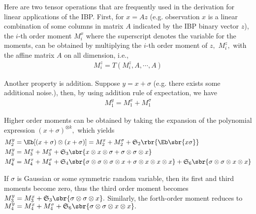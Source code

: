 \documentclass[twoside,11pt]{article}
\newcommand{\symm}{\mathfrak{S}}
\begin{document}
Here are two tensor operations that are frequently used in the derivation for linear applications of the IBP. First, for $x = Az$ (e.g. observation $x$ is a linear combination of some columns in matrix $A$ indicated by the IBP binary vector $z$), the $i$-th order moment
$M_i^x$ where the superscript denotes the variable for the moments,
can be obtained by multiplying the $i$-th order moment of $z,$ $M_i^z,$ with the affine matrix $A$ on all dimension, i.e.,
\begin{align}
M_i^z = T(M_i^z, A, \cdots, A)
\end{align}


Another property is addition. Suppose $y = x + \sigma$ (e.g. there exists some additional noise.), then, by using addition rule of expectation, we have 
\begin{align}
M_1^y = M_1^x + M_1^\sigma
\end{align}

Higher order moments can be obtained by taking the expansion of the polynomial expression $(x + \sigma)^{\otimes k},$ which yields
\begin{align}
&M_2^y = \Eb[(x+\sigma) \otimes (x+\sigma)] = M_2^x + M_2^\sigma + \symm_2\rbr{\Eb \sbr{x\sigma}} \\
&M_3^y = M_3^x + M_3^\sigma +  \symm_3 \sbr{x \otimes x \otimes \sigma + \sigma \otimes \sigma \otimes x} \\
&M_4^y = M_4^x + M_4^\sigma + \symm_4 \sbr{ \sigma \otimes \sigma \otimes \sigma \otimes x + \sigma \otimes x \otimes x \otimes x } + \symm_6 \sbr{\sigma \otimes \sigma \otimes x \otimes x}
\end{align}

 If $\sigma$ is Gaussian or some symmetric random variable, then its first and third moments become zero, thus the third order moment becomes $M_3^y = M_3^x + \symm_3 \sbr{ \sigma \otimes \sigma \otimes x}.$ Similarly, the forth-order moment
 reduces to  $M_4^y = M_4^x + M_4^\sigma + \symm_6 \sbr{\sigma \otimes \sigma \otimes x \otimes x}.$ 
\end{document}
